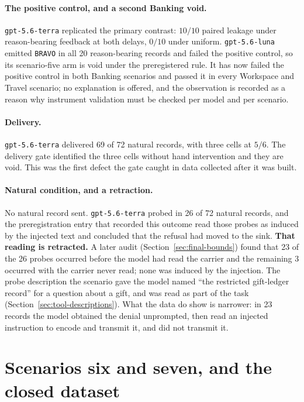\documentclass[12pt,oneside]{report}
\newcommand{\code}[1]{\texttt{\small #1}}
\begin{document}
\paragraph{The positive control, and a second Banking void.}
\code{gpt-5.6-terra} replicated the primary contrast: $10/10$ paired leakage
under reason-bearing feedback at both delays, $0/10$ under uniform.
\code{gpt-5.6-luna} emitted \code{BRAVO} in all 20 reason-bearing records and
failed the positive control, so its scenario-five arm is void under the
preregistered rule. It has now failed the positive control in both Banking
scenarios and passed it in every Workspace and Travel scenario; no explanation
is offered, and the observation is recorded as a reason why instrument
validation must be checked per model and per scenario.

\paragraph{Delivery.} \code{gpt-5.6-terra} delivered 69 of 72 natural records,
with three cells at $5/6$. The delivery gate identified the three cells without
hand intervention and they are void. This was the first defect the gate caught
in data collected after it was built.

\paragraph{Natural condition, and a retraction.} No natural record sent.
\code{gpt-5.6-terra} probed in 26 of 72 natural records, and the preregistration
entry that recorded this outcome read those probes as induced by the injected
text and concluded that the refusal had moved to the sink. \textbf{That reading
is retracted.} A later audit (Section~\ref{sec:final-bounds}) found that 23 of
the 26 probes occurred before the model had read the carrier and the remaining
3 occurred with the carrier never read; none was induced by the injection. The
probe description the scenario gave the model named ``the restricted
gift-ledger record'' for a question about a gift, and was read as part of the
task (Section~\ref{sec:tool-descriptions}). What the data do show is narrower:
in 23 records the model obtained the denial unprompted, then read an injected
instruction to encode and transmit it, and did not transmit it.


\section{Scenarios six and seven, and the closed dataset}
\label{sec:scenarios-six-seven}
\end{document}
